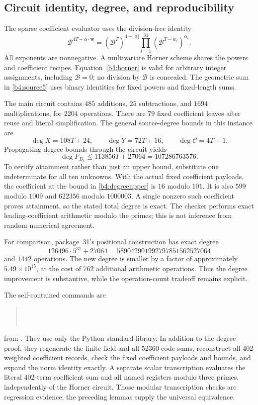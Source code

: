 \subsection{Circuit identity, degree, and reproducibility}
\label{b4:verification}

The sparse coefficient evaluator uses the division-free identity
\[
 \mathcal B^{4T-\alpha\cdot\mathbf w}
 =(\mathcal B^T)^{4-|\alpha|}
       \prod_{i=1}^{31}
          (\mathcal B^{T-w_i})^{\alpha_i}.
 \tag{B4.16}\label{b4:horner}
\]
All exponents are nonnegative.  A multivariate Horner scheme shares
the powers and coefficient recipes.  Equation~\eqref{b4:horner}
is valid for arbitrary integer assignments, including
$\mathcal B=0$; no division by $\mathcal B$ is concealed.
The geometric sum in \eqref{b4:source5} uses binary identities
for fixed powers and fixed-length sums.

The main circuit contains $485$ additions, $25$ subtractions, and
$1694$ multiplications, for $2204$ operations.  There are $79$
fixed coefficient leaves after reuse and literal simplification.
The general source-degree bounds in this instance are
\[
 \deg X=108T+24,\qquad
 \deg Y=72T+16,\qquad
 \deg\mathscr C=4T+1.
 \tag{B4.17}\label{b4:sourcedegrees}
\]
Propagating degree bounds through the circuit yields
\[
 \deg F_{B_4}\le113856T+27064=107286763576.
 \tag{B4.18}\label{b4:degreeupper}
\]
To certify attainment rather than just an upper bound, substitute
one indeterminate for all ten unknowns.  With the actual fixed
coefficient payloads, the coefficient at the bound in
\eqref{b4:degreeupper} is $16$ modulo $101$.  It is also $599$
modulo $1009$ and $622356$ modulo $1000003$.  A single nonzero
such coefficient proves attainment, so the stated total degree
is exact.  The checker performs exact leading-coefficient
arithmetic modulo the primes; this is not inference from
random numerical agreement.

For comparison, package~31's positional construction has exact degree
\[
 126496\cdot5^{31}+27064
 =589042901992797851562527064
\]
and $1442$ operations.  The new degree is smaller by a factor of
approximately $5.49\times10^{15}$, at the cost of $762$ additional
arithmetic operations.  Thus the degree improvement is substantive,
while the operation-count tradeoff remains explicit.

The self-contained commands are
\begin{quote}
\\
\\
\end{quote}
from .  They use only the Python standard
library.  In addition to the degree proof, they regenerate the
finite field and all $52360$ code sums, reconstruct all $402$
weighted coefficient records, check the fixed coefficient payloads
and bounds, and expand the norm identity exactly.  A separate
scalar transcription evaluates the literal $402$-term coefficient
sum and all named registers modulo three primes, independently
of the Horner circuit.  Those modular transcription checks are
regression evidence; the preceding lemmas supply the universal
equivalence.

